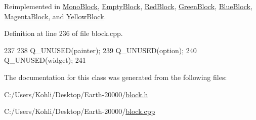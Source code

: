 Reimplemented in \hyperlink{class_mono_block_a8c2d5b6508508633c4c3234790945c51}{MonoBlock}, \hyperlink{class_empty_block_a1cec09fdef31d4404857dd22151a1834}{EmptyBlock}, \hyperlink{class_red_block_a78013615dbc11158d47eb38cc3d416cd}{RedBlock}, \hyperlink{class_green_block_a8ca48ce5449a83de5287d13d99bf2df1}{GreenBlock}, \hyperlink{class_blue_block_adc28e68ba0fa2c578815b77dde03ebdb}{BlueBlock}, \hyperlink{class_magenta_block_ac48f5303ee031233918abfa460dd7066}{MagentaBlock}, and \hyperlink{class_yellow_block_a37c29857cc065cab86a81bcfdd6c3f63}{YellowBlock}.

Definition at line 236 of file block.cpp.


\begin{DoxyCode}
237 {
238     Q_UNUSED(painter);
239     Q_UNUSED(option);
240     Q_UNUSED(widget);
241 }
\end{DoxyCode}


The documentation for this class was generated from the following files:\begin{DoxyCompactItemize}
\item 
C:/Users/Kohli/Desktop/Earth-\/20000/\hyperlink{block_8h}{block.h}\item 
C:/Users/Kohli/Desktop/Earth-\/20000/\hyperlink{block_8cpp}{block.cpp}\end{DoxyCompactItemize}
